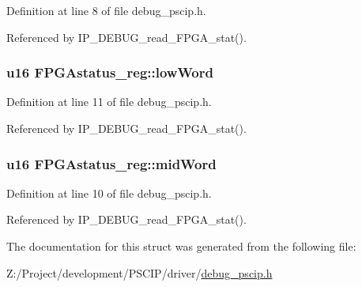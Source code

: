 Definition at line 8 of file debug\_\-pscip.h.

Referenced by IP\_\-DEBUG\_\-read\_\-FPGA\_\-stat().\hypertarget{struct_f_p_g_astatus__reg_ee4f129b3e11d331d362013695bc28b3}{
\subsubsection[{lowWord}]{\setlength{\rightskip}{0pt plus 5cm}u16 {\bf FPGAstatus\_\-reg::lowWord}}}
\label{struct_f_p_g_astatus__reg_ee4f129b3e11d331d362013695bc28b3}




Definition at line 11 of file debug\_\-pscip.h.

Referenced by IP\_\-DEBUG\_\-read\_\-FPGA\_\-stat().\hypertarget{struct_f_p_g_astatus__reg_9bd5d9537f9745dccf8f94ea35a78ba6}{
\subsubsection[{midWord}]{\setlength{\rightskip}{0pt plus 5cm}u16 {\bf FPGAstatus\_\-reg::midWord}}}
\label{struct_f_p_g_astatus__reg_9bd5d9537f9745dccf8f94ea35a78ba6}




Definition at line 10 of file debug\_\-pscip.h.

Referenced by IP\_\-DEBUG\_\-read\_\-FPGA\_\-stat().

The documentation for this struct was generated from the following file:\begin{CompactItemize}
\item 
Z:/Project/development/PSCIP/driver/\hyperlink{debug__pscip_8h}{debug\_\-pscip.h}\end{CompactItemize}
